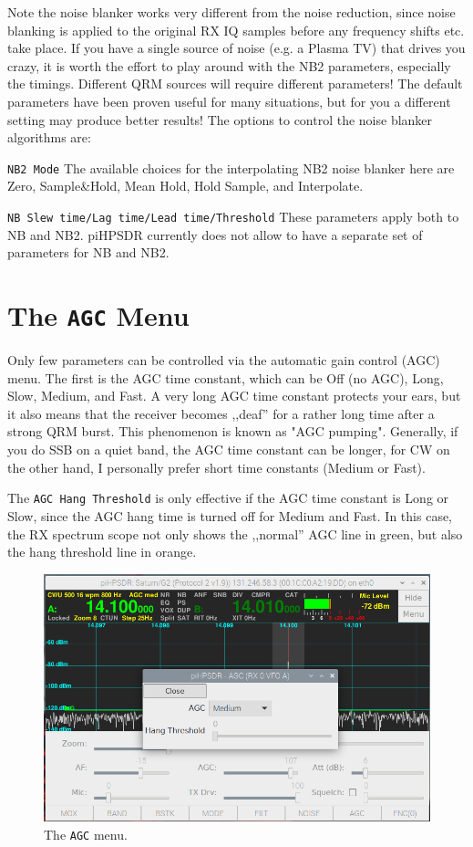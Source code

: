 \documentclass[12pt]{book}
\def\rett#1{\texttt{\color{red}#1}}
\def\bltt#1{\texttt{\color{blue}#1}}
\begin{document}
Note the noise blanker works very different from the noise reduction, since noise blanking
is applied to the original RX IQ samples before any frequency shifts etc. take place. 
If you have a single source of noise (e.g. a Plasma TV) that drives you crazy, it is worth
the effort to play around with the NB2 parameters, especially the timings. Different
QRM sources will require different parameters! The default parameters have been proven useful
for many situations, but for you a different setting may produce better results!
The options to control the noise blanker algorithms are:

\rett{NB2 Mode} The available choices for the interpolating NB2 noise blanker here are Zero,
Sample\&Hold, Mean Hold, Hold Sample, and Interpolate.

\rett{NB Slew time/Lag time/Lead time/Threshold} These parameters apply both to NB and NB2.
piHPSDR currently does not allow to have a separate set of parameters for NB and NB2.


\section{The \texttt{AGC} Menu}

Only few parameters can be controlled via the automatic gain control (AGC) menu.
The first is the AGC time constant, which can be Off (no AGC), Long, Slow, Medium,
and Fast. A very long AGC time constant protects your ears, but it also means that
the receiver becomes ,,deaf'' for a rather long time after a strong QRM burst. This
phenomenon is known as "AGC pumping". Generally, if you do SSB on a quiet band, the
AGC time constant can be longer, for CW on the other hand, I personally prefer short
time constants (Medium or Fast).

The \rett{AGC Hang Threshold} is only effective if the AGC time constant is Long or Slow,
since the AGC hang time is turned off for Medium and Fast.
In this case, the RX spectrum scope not only shows the ,,normal'' AGC line in green,
but also the hang threshold line in orange.

\begin{figure}[ht]
\center
\includegraphics[width=12cm]{AGCMenu.png}
\caption{The \bltt{AGC} menu.}
\label{fig:AGCMenu}
\end{figure}
\end{document}
